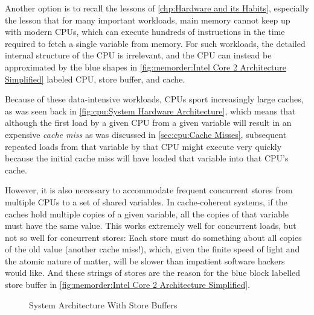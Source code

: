 Another option is to recall the lessons of
\cref{chp:Hardware and its Habits},
especially the lesson that for many important workloads, main memory
cannot keep up with modern CPUs, which can execute hundreds of
instructions in the time required to fetch a single variable from memory.
For such workloads, the detailed internal structure of the CPU is
irrelevant, and the CPU can instead be approximated by the blue shapes in
\cref{fig:memorder:Intel Core 2 Architecture Simplified}
labeled CPU, store buffer, and cache.

Because of these data-intensive workloads, CPUs sport increasingly large
caches, as was seen back in
\cref{fig:cpu:System Hardware Architecture},
which means that although the first load by a given CPU from a given
variable will result in an expensive \emph{cache miss} as was discussed in
\cref{sec:cpu:Cache Misses}, subsequent
repeated loads from that variable by that CPU might execute
very quickly because the initial cache miss will have loaded that
variable into that CPU's cache.

However, it is also necessary to accommodate frequent concurrent stores
from multiple CPUs to a set of shared variables.
In cache-coherent systems, if the caches hold multiple copies of a given
variable, all the copies of that variable must have the same value.
This works extremely well for concurrent loads, but not so well for
concurrent stores:
Each store must do something about all copies of the old value
(another cache miss!), which, given the finite speed of light and
the atomic nature of matter, will be slower than impatient software
hackers would like.
And these strings of stores are the reason for the blue block
labelled store buffer in
\cref{fig:memorder:Intel Core 2 Architecture Simplified}.

\begin{figure}
\centering
{}
\caption{System Architecture With Store Buffers}
\label{fig:memorder:System Architecture With Store Buffers}
\end{figure}

